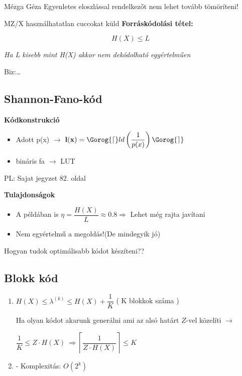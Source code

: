 \begin{definicio}{Mézga Géza} Egyenletes eloszlással rendelkezőt nem lehet tovább tömöríteni!\\[2pt]
\end{definicio}

\begin{tetel}{MZ/X használhatatlan cuccokat küld}
\textbf{Forráskódolási tétel:}

$$H(X) \leq L$$

\textit{Ha L kisebb mint H(X) akkor nem dekódolható egyértelműen}
\end{tetel}

Biz:\ldots\\[2pt] %

\subsection{Shannon-Fano-kód}

\textbf{Kódkonstrukció}
\begin{itemize}
	\item Adott p(x) $\rightarrow$ $\mathbf{l(x)} = \Gorog{\lceil} ld\left( \dfrac{1}{p(x)} \right) \Gorog{\rceil}$
	\item bináris fa $\rightarrow$ LUT
\end{itemize}
\small PL: Sajat jegyzet 82. oldal \normalsize

\textbf{Tulajdonságok}
\begin{itemize}
	\item A példában is $ \eta = \dfrac{H(X)}{L} \approx 0.8 \Longrightarrow$ Lehet még rajta javítani
	\item Nem egyértelmű a megoldás!(De mindegyik jó)
\end{itemize}

Hogyan tudok optimálisabb kódot készíteni??

\subsection{Blokk kód}

	\begin{enumerate}
		\item $H(X) \leq \lambda^{(k)} \leq H(X) + \dfrac{1}{K}$ \quad ( K blokkok száma )

			 Ha olyan kódot akarunk generálni ami az alsó határt $Z$-vel közelíti $\longrightarrow$

			 $\dfrac{1}{K} \leq Z \cdot H(X) \ \Longrightarrow \left\lceil \dfrac{1}{Z \cdot H(X) } \right\rceil \leq K $

		\item - Komplexitás: $O(2^k)$
	\end{enumerate}

